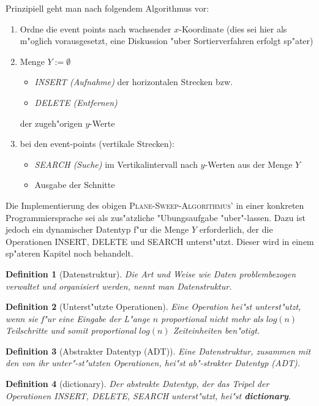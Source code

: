 \documentclass[draft,12pt]{scrreprt}
\theoremstyle{break}
\newtheorem{definition}{Definition}
\begin{document}
Prinzipiell geht man nach folgendem Algorithmus vor:
\begin{enumerate}
 \item Ordne die event points nach wachsender $x$-Koordinate (dies sei hier
  als m"oglich vorausgesetzt, eine Diskussion "uber Sortierverfahren erfolgt
  sp"ater)
 \item Menge $Y := \emptyset$  
  \begin{itemize}
   \item \textit{INSERT (Aufnahme)} der horizontalen Strecken bzw.
   \item \textit{DELETE (Entfernen)}
  \end{itemize}
  der zugeh"origen $y$-Werte
 \item bei den event-points (vertikale Strecken):
  \begin{itemize}
   \item \textit{SEARCH (Suche)} im Vertikalintervall nach $y$-Werten aus der 
    Menge $Y$
   \item Ausgabe der Schnitte
  \end{itemize}
\end{enumerate}

Die Implementierung des obigen
\textsc{Plane-Sweep-Algorithmus'} in einer konkreten Programmiersprache
sei als zus"atzliche "Ubungsaufgabe "uber"-lassen. Dazu ist jedoch ein dynamischer
Datentyp f"ur die Menge $Y$ erforderlich, der die Operationen INSERT,
DELETE und SEARCH unterst"utzt. Dieser wird in einem sp"ateren Kapitel noch behandelt. 

\begin{definition}[Datenstruktur]
  Die Art und Weise wie Daten problembezogen verwaltet und organisiert
  werden, nennt man Datenstruktur.
\end{definition}

\label{ADT}
\begin{definition}[Unterst"utzte Operationen]
  Eine Operation hei"st unterst"utzt, wenn sie f"ur eine Eingabe
  der L"ange $n$ proportional nicht mehr als $log(n)$ Teilschritte und
  somit proportional $log(n)$ Zeiteinheiten ben"otigt.
\end{definition}

\begin{definition}[Abstrakter Datentyp (ADT)]
  Eine Datenstruktur, zusammen mit den von ihr unter"-st"utzten Operationen, 
  hei"st ab"-strakter Datentyp (ADT).
\end{definition}

\begin{definition}[dictionary]
  Der abstrakte Datentyp, der das Tripel der Operationen \textit{INSERT},
  \textit{DELETE}, \textit{SEARCH} unterst"utzt, hei"st \textbf{dictionary}.
\end{definition}
\end{document}
